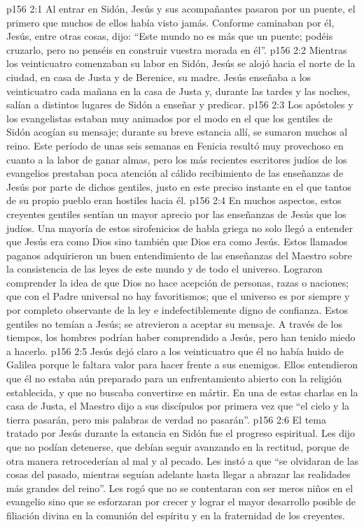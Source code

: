 \vs p156 2:1 Al entrar en Sidón, Jesús y sus acompañantes pasaron por un puente, el primero que muchos de ellos había visto jamás. Conforme caminaban por él, Jesús, entre otras cosas, dijo: “Este mundo no es más que un puente; podéis cruzarlo, pero no penséis en construir vuestra morada en él”.
\vs p156 2:2 \pc Mientras los veinticuatro comenzaban su labor en Sidón, Jesús se alojó hacia el norte de la ciudad, en casa de Justa y de Berenice, su madre. Jesús enseñaba a los veinticuatro cada mañana en la casa de Justa y, durante las tardes y las noches, salían a distintos lugares de Sidón a enseñar y predicar.
\vs p156 2:3 Los apóstoles y los evangelistas estaban muy animados por el modo en el que los gentiles de Sidón acogían su mensaje; durante su breve estancia allí, se sumaron muchos al reino. Este período de unas seis semanas en Fenicia resultó muy provechoso en cuanto a la labor de ganar almas, pero los más recientes escritores judíos de los evangelios prestaban poca atención al cálido recibimiento de las enseñanzas de Jesús por parte de dichos gentiles, justo en este preciso instante en el que tantos de su propio pueblo eran hostiles hacia él.
\vs p156 2:4 En muchos aspectos, estos creyentes gentiles sentían un mayor aprecio por las enseñanzas de Jesús que los judíos. Una mayoría de estos sirofenicios de habla griega no solo llegó a entender que Jesús era como Dios sino también que Dios era como Jesús. Estos llamados paganos adquirieron un buen entendimiento de las enseñanzas del Maestro sobre la consistencia de las leyes de este mundo y de todo el universo. Lograron comprender la idea de que Dios no hace acepción de personas, razas o naciones; que con el Padre universal no hay favoritismos; que el universo es por siempre y por completo observante de la ley e indefectiblemente digno de confianza. Estos gentiles no temían a Jesús; se atrevieron a aceptar su mensaje. A través de los tiempos, los hombres podrían haber comprendido a Jesús, pero han tenido miedo a hacerlo.
\vs p156 2:5 \pc Jesús dejó claro a los veinticuatro que él no había huido de Galilea porque le faltara valor para hacer frente a sus enemigos. Ellos entendieron que él no estaba aún preparado para un enfrentamiento abierto con la religión establecida, y que no buscaba convertirse en mártir. En una de estas charlas en la casa de Justa, el Maestro dijo a sus discípulos por primera vez que “el cielo y la tierra pasarán, pero mis palabras de verdad no pasarán”.
\vs p156 2:6 \pc El tema tratado por Jesús durante la estancia en Sidón fue el progreso espiritual. Les dijo que no podían detenerse, que debían seguir avanzando en la rectitud, porque de otra manera retrocederían al mal y al pecado. Les instó a que “se olvidaran de las cosas del pasado, mientras seguían adelante hasta llegar a abrazar las realidades más grandes del reino”. Les rogó que no se contentaran con ser meros niños en el evangelio sino que se esforzaran por crecer y lograr el mayor desarrollo posible de filiación divina en la comunión del espíritu y en la fraternidad de los creyentes.
